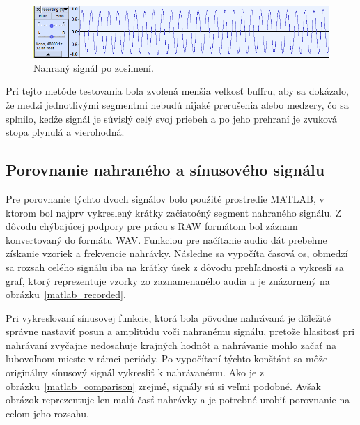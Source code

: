 \begin{figure}[hbt]
	\centering
	\includegraphics[width=1\textwidth]{obrazky-figures/audacity_sinus_zoom.png}
	\caption{Nahraný signál po zosilnení.}
	\label{audacity_sinus_zoom}
\end{figure}

Pri tejto metóde testovania bola zvolená menšia veľkosť buffru, aby sa dokázalo, že medzi jednotlivými segmentmi nebudú nijaké prerušenia alebo medzery, čo sa splnilo, keďže signál je súvislý celý svoj priebeh a po jeho prehraní je zvuková stopa plynulá a vierohodná.

\subsection*{Porovnanie nahraného a sínusového signálu}

Pre porovnanie týchto dvoch signálov bolo použité prostredie MATLAB, v ktorom bol najprv vykreslený krátky začiatočný segment nahraného signálu. Z dôvodu chýbajúcej podpory pre prácu s RAW formátom bol záznam konvertovaný do formátu WAV. Funkciou pre načítanie audio dát prebehne získanie vzoriek a frekvencie nahrávky. Následne sa vypočíta časová os, obmedzí sa rozsah celého signálu iba na krátky úsek z dôvodu prehľadnosti a vykreslí sa graf, ktorý reprezentuje vzorky zo zaznamenaného audia a je znázornený na obrázku~\ref{matlab_recorded}.


Pri vykresľovaní sínusovej funkcie, ktorá bola pôvodne nahrávaná je dôležité správne nastaviť posun a amplitúdu voči nahranému signálu, pretože hlasitosť pri nahrávaní zvyčajne nedosahuje krajných hodnôt a nahrávanie mohlo začať na ľubovoľnom mieste v rámci periódy. Po vypočítaní týchto konštánt sa môže originálny sínusový signál vykresliť k nahrávanému. Ako je z obrázku~\ref{matlab_comparison} zrejmé, signály sú si veľmi podobné. Avšak obrázok reprezentuje len malú časť nahrávky a je potrebné urobiť porovnanie na celom jeho rozsahu.


